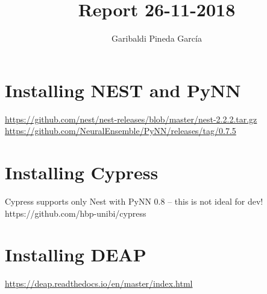 \documentclass[11pt,a4paper]{article}
\author{Garibaldi Pineda Garc{\'i}a}
\title{Report 26-11-2018}
\begin{document}
\maketitle

\section{Installing NEST and PyNN}
\url{https://github.com/nest/nest-releases/blob/master/nest-2.2.2.tar.gz}
\url{https://github.com/NeuralEnsemble/PyNN/releases/tag/0.7.5}

\section{Installing Cypress}
Cypress supports only Nest with PyNN 0.8 -- this is not ideal for dev!
https://github.com/hbp-unibi/cypress

\section{Installing DEAP}
\url{https://deap.readthedocs.io/en/master/index.html}
\end{document}
